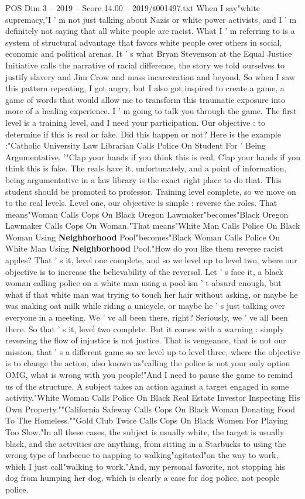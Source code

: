 \begin{textsample}{POS Dim 3 – 2019 – Score 14.00 – 2019/t001497.txt}
When I say"white supremacy,"I ' m not just talking about Nazis or white power activists, and I ' m definitely not saying that all white people are racist.
What I ' m referring to is a system of structural advantage that favors white people over others in social, economic and political arenas.
It ' s what Bryan Stevenson at the Equal Justice Initiative calls the narrative of racial difference, the story we told ourselves to justify slavery and Jim Crow and mass incarceration and beyond.
So when I saw this pattern repeating, I got angry, but I also got inspired to create a game, a game of words that would allow me to transform this traumatic exposure into more of a healing experience.
I ' m going to talk you through the game.
The first level is a training level, and I need your participation.
Our objective : to determine if this is real or fake.
Did this happen or not?
Here is the example :"Catholic University Law Librarian Calls Police On Student For ' Being Argumentative. '"Clap your hands if you think this is real.
Clap your hands if you think this is fake.
The reals have it, unfortunately, and a point of information, being argumentative in a law library is the exact right place to do that.
This student should be promoted to professor.
Training level complete, so we move on to the real levels.
Level one, our objective is simple : reverse the roles.
That means"Woman Calls Cops On Black Oregon Lawmaker"becomes"Black Oregon Lawmaker Calls Cops On Woman."That means"White Man Calls Police On Black Woman Using \textbf{Neighborhood} Pool"becomes"Black Woman Calls Police On White Man Using \textbf{Neighborhood} Pool."How do you like them reverse racist apples?
That ' s it, level one complete, and so we level up to level two, where our objective is to increase the believability of the reversal.
Let ' s face it, a black woman calling police on a white man using a pool isn ' t absurd enough, but what if that white man was trying to touch her hair without asking, or maybe he was making oat milk while riding a unicycle, or maybe he ' s just talking over everyone in a meeting.
We ' ve all been there, right?
Seriously, we ' ve all been there.
So that ' s it, level two complete.
But it comes with a warning : simply reversing the flow of injustice is not justice.
That is vengeance, that is not our mission, that ' s a different game so we level up to level three, where the objective is to change the action, also known as"calling the police is not your only option OMG, what is wrong with you people!"And I need to pause the game to remind us of the structure.
A subject takes an action against a target engaged in some activity."White Woman Calls Police On Black Real Estate Investor Inspecting His Own Property.""California Safeway Calls Cops On Black Woman Donating Food To The Homeless.""Gold Club Twice Calls Cops On Black Women For Playing Too Slow."In all these cases, the subject is usually white, the target is usually black, and the activities are anything, from sitting in a Starbucks to using the wrong type of barbecue to napping to walking"agitated"on the way to work, which I just call"walking to work."And, my personal favorite, not stopping his dog from humping her dog, which is clearly a case for dog police, not people police.

\end{textsample}
